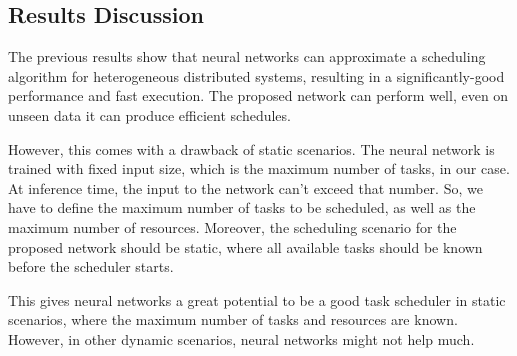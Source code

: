 \subsection{Results Discussion}
The previous results show that neural networks can approximate a scheduling algorithm for heterogeneous distributed systems, resulting in a significantly-good performance and fast execution. The proposed network can perform well, even on unseen data it can produce efficient schedules.

However, this comes with a drawback of static scenarios. The neural network is trained with fixed input size, which is the maximum number of tasks, in our case. At inference time, the input to the network can't exceed that number. So, we have to define the maximum number of tasks to be scheduled, as well as the maximum number of resources. Moreover, the scheduling scenario for the proposed network should be static, where all available tasks should be known before the scheduler starts. 

This gives neural networks a great potential to be a good task scheduler in static scenarios, where the maximum number of tasks and resources are known. However, in other dynamic scenarios, neural networks might not help much. 